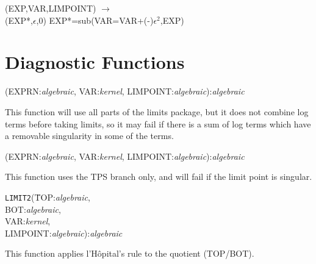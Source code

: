 \vspace{.1in}
 (EXP,VAR,LIMPOINT) $\rightarrow$ \\
\hspace*{2em}{\tt LIMIT}(EXP*,$\epsilon$,0)
EXP*=sub(VAR=VAR+(-)$\epsilon^2$,EXP)

\section{Diagnostic Functions}

\vspace{.1in}
(EXPRN:{\em algebraic}, VAR:{\em kernel},
LIMPOINT:{\em algebraic}):{\em algebraic}
\vspace{.1in}

This function will use all parts of the limits package, but it does not
combine log terms before taking limits, so it may fail if there is a sum
of log terms which have a removable singularity in some of the terms.

\vspace{.1in}
(EXPRN:{\em algebraic}, VAR:{\em kernel},
LIMPOINT:{\em algebraic}):{\em algebraic}
\vspace{.1in}

This function uses the TPS branch only, and will fail if the limit point is
singular.

\vspace{.1in}
\begin{tabbing}
{\tt LIMIT2}(\=TOP:{\em algebraic}, \\
\>BOT:{\em algebraic}, \\
\>VAR:{\em kernel}, \\
\>LIMPOINT:{\em algebraic}):{\em algebraic}
\end{tabbing}
\vspace{.1in}

This function applies l'H\^opital's rule to the quotient (TOP/BOT).

